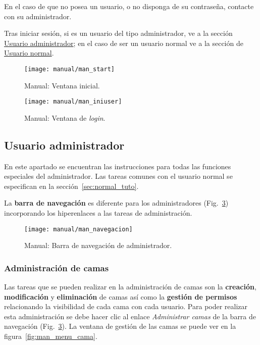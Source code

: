 En el caso de que no posea un usuario, o no disponga de su contraseña, contacte con su administrador.

Tras iniciar sesión, si es un usuario del tipo administrador, ve a la sección \hyperref[sec:admin_tuto]{Usuario administrador}; en el caso de ser un usuario normal ve a la sección de \hyperref[sec:normal_tuto]{Usuario normal}.

\begin{figure}
	\centering
	\texttt{[image: manual/man\_start]}
	\caption{Manual: Ventana inicial.}
	\label{fig:man_start}
\end{figure}
\begin{figure}
	\centering
	\texttt{[image: manual/man\_iniuser]}
	\caption{Manual: Ventana de \textit{login}.}
	\label{fig:man_inicio}
\end{figure}

\subsection{Usuario administrador}\label{sec:admin_tuto}

En este apartado se encuentran las instrucciones para todas las funciones especiales del administrador. Las tareas comunes con el usuario normal se especifican en la sección~\ref{sec:normal_tuto}.

La \textbf{barra de navegación} es diferente para los administradores (Fig.~\ref{fig:man_nav}) incorporando los hiperenlaces a las tareas de administración.

\begin{figure}
	\centering
	\texttt{[image: manual/man\_navegacion]}
	\caption{Manual: Barra de navegación de administrador.}
	\label{fig:man_nav}
\end{figure}

\subsubsection{Administración de camas}

Las tareas que se pueden realizar en la administración de camas son la \textbf{creación}, \textbf{modificación} y \textbf{eliminación} de camas así como la \textbf{gestión de permisos} relacionando la visibilidad de cada cama con cada usuario.  Para poder realizar esta administración se debe hacer clic al enlace \textit{Administrar camas} de la barra de navegación (Fig.~\ref{fig:man_nav}). La ventana de gestión de las camas se puede ver en la figura~\ref{fig:man_menu_cama}.

